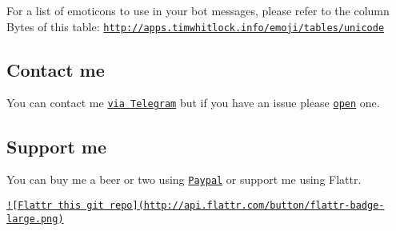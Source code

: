 For a list of emoticons to use in your bot messages, please refer to the column Bytes of this table\-: \href{http://apps.timwhitlock.info/emoji/tables/unicode}{\tt http\-://apps.\-timwhitlock.\-info/emoji/tables/unicode}

\subsection*{Contact me }

You can contact me \href{https://telegram.me/ggrillo}{\tt via Telegram} but if you have an issue please \href{https://github.com/Eleirbag89/TelegramBotPHP/issues}{\tt open} one.

\subsection*{Support me }

You can buy me a beer or two using \href{https://paypal.me/eleirbag89}{\tt Paypal} or support me using Flattr.

\href{https://flattr.com/submit/auto?user_id=eleirbag89&url=https://github.com/Eleirbag89/TelegramBotPHP&title=TelegramBotPHP&language=&tags=github&category=software}{\tt !\mbox{[}Flattr this git repo\mbox{]}(http\-://api.\-flattr.\-com/button/flattr-\/badge-\/large.\-png)} 